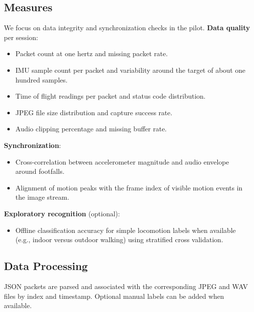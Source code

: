 \documentclass[manuscript,review,anonymous]{acmart}
\begin{document}
\subsection{Measures}
We focus on data integrity and synchronization checks in the pilot.
\textbf{Data quality} per session:
\begin{itemize}
  \item Packet count at one hertz and missing packet rate.
  \item IMU sample count per packet and variability around the target of about one hundred samples.
  \item Time of flight readings per packet and status code distribution.
  \item JPEG file size distribution and capture success rate.
  \item Audio clipping percentage and missing buffer rate.
\end{itemize}
\textbf{Synchronization}:
\begin{itemize}
  \item Cross-correlation between accelerometer magnitude and audio envelope around footfalls.
  \item Alignment of motion peaks with the frame index of visible motion events in the image stream.
\end{itemize}
\textbf{Exploratory recognition} (optional):
\begin{itemize}
  \item Offline classification accuracy for simple locomotion labels when available (e.g., indoor versus outdoor walking) using stratified cross validation.
\end{itemize}

\subsection{Data Processing}
JSON packets are parsed and associated with the corresponding JPEG and WAV files by index and timestamp. Optional manual labels can be added when available.
\end{document}
